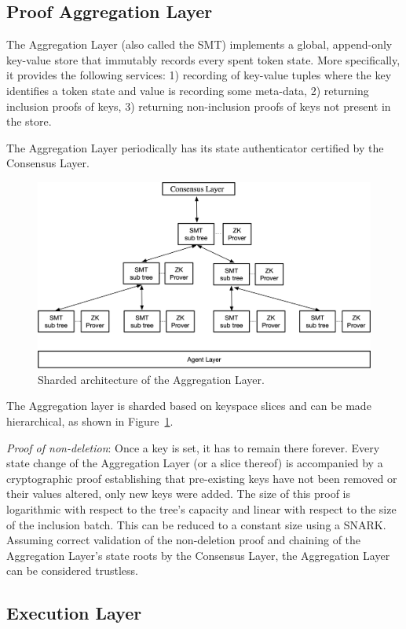 \documentclass[twocolumn]{article}
\begin{document}
\subsection{Proof Aggregation Layer}

The Aggregation Layer (also called the SMT) implements a global, append-only key-value store that immutably records every spent token state. More specifically, it provides the following services: 1) recording of key-value tuples where the key identifies a token state and value is recording some meta-data, 2) returning inclusion proofs of keys, 3) returning non-inclusion proofs of keys not present in the store.

The Aggregation Layer periodically has its state authenticator certified by the Consensus Layer.

\begin{figure}[!t]
    \centering
    \includegraphics[width=.7\textwidth]{pic/layers}
    \caption{Sharded architecture of the Aggregation Layer.}\label{fig:sharding}
\end{figure}

The Aggregation layer is sharded based on keyspace slices and can be made hierarchical, as shown in Figure~\ref{fig:sharding}.

\emph{Proof of non-deletion}: Once a key is set, it has to remain there forever. Every state change of the Aggregation Layer (or a slice thereof) is accompanied by a cryptographic proof establishing that pre-existing keys have not been removed or their values altered, only new keys were added. The size of this proof is logarithmic with respect to the tree's capacity and linear with respect to the size of the inclusion batch. This can be reduced to a constant size using a SNARK. Assuming correct validation of the non-deletion proof and chaining of the Aggregation Layer's state roots by the Consensus Layer, the Aggregation Layer can be considered trustless.


\subsection{Execution Layer}
\end{document}
